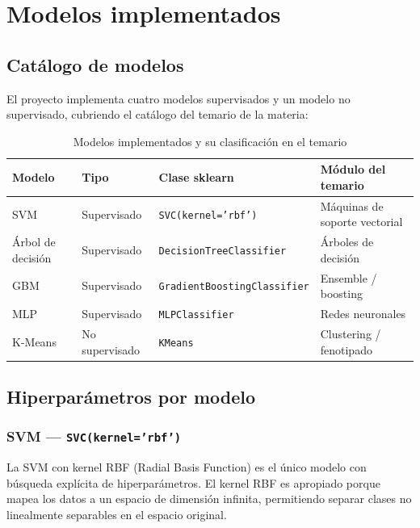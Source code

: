 \documentclass[12pt,a4paper]{article}
\begin{document}
\section{Modelos implementados}

\subsection{Catálogo de modelos}

El proyecto implementa cuatro modelos supervisados y un modelo no supervisado, cubriendo el catálogo del temario de la materia:

\begin{table}[H]
  \centering
  \caption{Modelos implementados y su clasificación en el temario}
  \label{tab:modelos}
  \begin{tabularx}{\linewidth}{llXl}
    \toprule
    \textbf{Modelo} & \textbf{Tipo} & \textbf{Clase sklearn} & \textbf{Módulo del temario}\\
    \midrule
    SVM & Supervisado & \texttt{SVC(kernel='rbf')} & Máquinas de soporte vectorial\\
    Árbol de decisión & Supervisado & \texttt{DecisionTreeClassifier} & Árboles de decisión\\
    GBM & Supervisado & \texttt{GradientBoostingClassifier} & Ensemble / boosting\\
    MLP & Supervisado & \texttt{MLPClassifier} & Redes neuronales\\
    K-Means & No supervisado & \texttt{KMeans} & Clustering / fenotipado\\
    \bottomrule
  \end{tabularx}
\end{table}

\subsection{Hiperparámetros por modelo}

\subsubsection{SVM — \texttt{SVC(kernel='rbf')}}

La SVM con kernel RBF (Radial Basis Function) es el único modelo con búsqueda explícita de hiperparámetros. El kernel RBF es apropiado porque mapea los datos a un espacio de dimensión infinita, permitiendo separar clases no linealmente separables en el espacio original.
\end{document}
